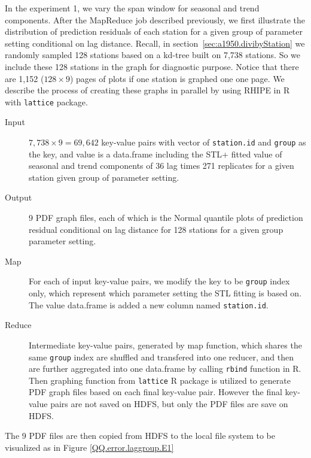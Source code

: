 In the experiment 1, we vary the span window for seasonal and trend components. 
After the MapReduce job described previously, we first illustrate the distribution
of prediction residuals of each station for a given group of parameter setting
conditional on lag distance. Recall, in section~\ref{sec:a1950.divibyStation} we
randomly sampled 128 stations based on a kd-tree built on 7,738 stations. So we 
include these 128 stations in the graph for diagnostic purpose. Notice that there
are 1,152 ($128 \times 9$) pages of plots if one station is graphed one one page.
We describe the process of creating these graphs in parallel by using RHIPE in R
with \texttt{lattice} package.

\begin{description}
  \item[Input] $7,738 \times 9 = 69,642$ key-value pairs with vector of 
  \texttt{station.id} and \texttt{group} as the key, and value is a data.frame
  including the STL+ fitted value of seasonal and trend components of 36 lag 
  times 271 replicates for a given station given group of parameter setting.
  \item[Output] 9 PDF graph files, each of which is the Normal quantile plots of
  prediction residual conditional on lag distance for 128 stations for a given
  group parameter setting.  
  \item[Map] For each of input key-value pairs, we modify the key to be 
  \texttt{group} index only, which represent which parameter setting the STL fitting
  is based on. The value data.frame is added a new column named \texttt{station.id}.
  \item[Reduce] Intermediate key-value pairs, generated by map function, which 
  shares the same \texttt{group} index are shuffled and transfered into one reducer,
  and then are further aggregated into one data.frame by calling \texttt{rbind} 
  function in R. Then graphing function from \texttt{lattice} R package is utilized
  to generate PDF graph files based on each final key-value pair. However the 
  final key-value pairs are not saved on HDFS, but only the PDF files are save on
  HDFS. 
\end{description} 

The 9 PDF files are then copied from HDFS to the local file system to be visualized
as in Figure {\ref{QQ.error.laggroup.E1}}

